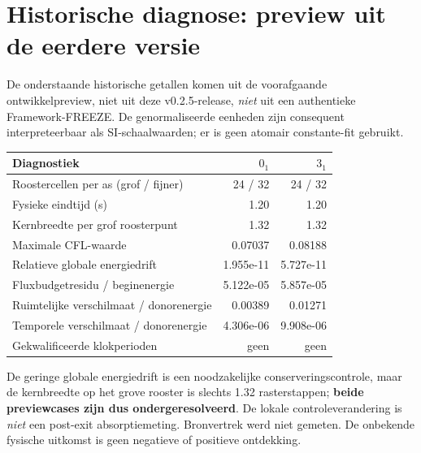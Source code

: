 \documentclass[10pt,a4paper]{article}
\begin{document}
\section{Historische diagnose: preview uit de eerdere versie}
De onderstaande historische getallen komen uit de voorafgaande ontwikkelpreview, niet uit deze v0.2.5-release, \emph{niet} uit een authentieke Framework-FREEZE. De genormaliseerde eenheden zijn consequent interpreteerbaar als SI-schaalwaarden; er is geen atomair constante-fit gebruikt.
\begin{center}\begin{tabular}{lrr}\toprule
Diagnostiek & $0_1$ & $3_1$\\\midrule
Roostercellen per as (grof / fijner) & 24 / 32 & 24 / 32\\
Fysieke eindtijd (s) & 1.20 & 1.20\\
Kernbreedte per grof roosterpunt & 1.32 & 1.32\\
Maximale CFL-waarde & 0.07037 & 0.08188\\
Relatieve globale energiedrift & 1.955e-11 & 5.727e-11\\
Fluxbudgetresidu / beginenergie & 5.122e-05 & 5.857e-05\\
Ruimtelijke verschilmaat / donorenergie & 0.00389 & 0.01271\\
Temporele verschilmaat / donorenergie & 4.306e-06 & 9.908e-06\\
Gekwalificeerde klokperioden & geen & geen\\\bottomrule
\end{tabular}\end{center}
De geringe globale energiedrift is een noodzakelijke conserveringscontrole, maar de kernbreedte op het grove rooster is slechts 1.32 rasterstappen; \textbf{beide previewcases zijn dus ondergeresolveerd}. De lokale controleverandering is \emph{niet} een post-exit absorptiemeting. Bronvertrek werd niet gemeten. De onbekende fysische uitkomst is geen negatieve of positieve ontdekking.
\end{document}
